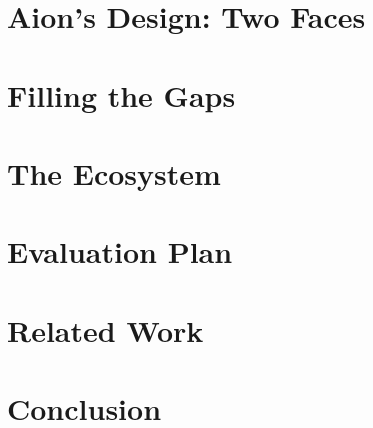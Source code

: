 \documentclass[11pt,a4paper]{article}
\begin{document}
\section{Aion's Design: Two Faces}
\label{sec:design}

\section{Filling the Gaps}
\label{sec:gaps}

\section{The Ecosystem}
\label{sec:ecosystem}

\section{Evaluation Plan}
\label{sec:eval}

\section{Related Work}
\label{sec:related}

\section{Conclusion}
\label{sec:conclusion}



\end{document}
